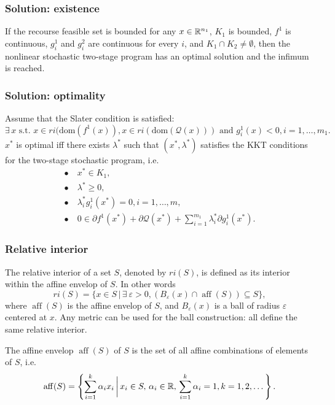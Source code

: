 \documentclass{beamer}
\def\aff{\operatorname{aff}}
\begin{document}
\begin{frame}
\frametitle{Solution: existence}

\begin{theorem}
	If the recourse feasible set is bounded for any $x \in {\mathbb{R}}^{n_1}$, $K_1$ is bounded, $f^1$ is continuous, $g_i^1$ and $g_i^2$ are continuous for every $i$, and $K_1 \cap K_2 \ne \emptyset$,
	then the nonlinear stochastic two-stage program has an optimal solution and the infimum is reached.
\end{theorem}

\end{frame}

\begin{frame}
\frametitle{Solution: optimality}

\begin{theorem}
Assume that the Slater condition is satisfied:
$$
 \exists\, x \text{ s.t. } x \in ri(\mbox{dom}(f^1(x)), x \in ri(\mbox{dom}(\mathcal{Q}(x))) \text{ and } g_i^1(x) < 0, i = 1,\ldots,m_1.
$$
$x^*$ is optimal iff there exists $\lambda^*$ such that $(x^*, \lambda^*)$ satisfies the KKT conditions for the two-stage stochastic program, i.e.
\begin{align*}
\bullet\ & x^* \in K_1, \\
\bullet\ & \lambda^* \geq 0, \\ 
\bullet\ & \lambda_i^*g_i^1(x^*) = 0, i = 1,\ldots,m, \\
\bullet\ & 0 \in \partial f^1(x^*) + \partial \mathcal{Q}(x^*) +
 \sum_{i=1}^{m_1}\lambda_i^* \partial g_i^1(x^*).
\end{align*}
\end{theorem}

\end{frame}

\begin{frame}
	\frametitle{Relative interior}
	
	The {\red relative interior} of a set $S$, denoted by $ri(S)$, is defined as its interior within the affine envelop of $S$.
	In other words
	\[
	ri(S) = \lbrace x \in S \,|\, \exists\ \varepsilon > 0, (B_{\varepsilon}(x)
	\cap \aff(S)) \subseteq S \rbrace,
	\]
	where $\aff(S)$ is the {\red affine envelop} of $S$, and $B_{\varepsilon}(x)$
	is a ball of radius ${\varepsilon}$ centered at $x$.
	Any metric can be used for the ball construction: all define the same relative interior.
	
	\mbox{}
	
	The {\red affine envelop} $\aff(S)$ of $S$ is the set of all affine combinations of elements of $S$, i.e.
	\[
	\operatorname{aff} (S)=\left\lbrace \sum_{i=1}^k \alpha_i x_i \,\bigg|\,
	x_i\in S, \, \alpha_i\in {\mathbb{R}}, \, \sum_{i=1}^k \alpha_i=1,
	k=1, 2, \dots\right\rbrace. 
	\]
\end{frame}
\end{document}
